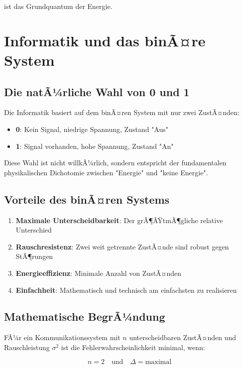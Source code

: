 ﻿\documentclass[12pt,a4paper]{article}
\theoremstyle{definition}
\theoremstyle{remark}
\begin{document}
ist das Grundquantum der Energie.

\section{Informatik und das binÃ¤re System}

\subsection{Die natÃ¼rliche Wahl von 0 und 1}

Die Informatik basiert auf dem binÃ¤ren System mit nur zwei ZustÃ¤nden:
\begin{itemize}
\item \textbf{0}: Kein Signal, niedrige Spannung, Zustand "Aus"
\item \textbf{1}: Signal vorhanden, hohe Spannung, Zustand "An"
\end{itemize}

Diese Wahl ist nicht willkÃ¼rlich, sondern entspricht der fundamentalen physikalischen Dichotomie zwischen "Energie" und "keine Energie".

\subsection{Vorteile des binÃ¤ren Systems}

\begin{enumerate}
\item \textbf{Maximale Unterscheidbarkeit}: Der grÃ¶ÃŸtmÃ¶gliche relative Unterschied
\item \textbf{Rauschresistenz}: Zwei weit getrennte ZustÃ¤nde sind robust gegen StÃ¶rungen
\item \textbf{Energieeffizienz}: Minimale Anzahl von ZustÃ¤nden
\item \textbf{Einfachheit}: Mathematisch und technisch am einfachsten zu realisieren
\end{enumerate}

\subsection{Mathematische BegrÃ¼ndung}

FÃ¼r ein Kommunikationssystem mit $n$ unterscheidbaren ZustÃ¤nden und Rauschleistung $\sigma^2$ ist die Fehlerwahrscheinlichkeit minimal, wenn:

\begin{equation}
n = 2 \quad \text{und} \quad \Delta = \text{maximal}
\end{equation}
\end{document}
